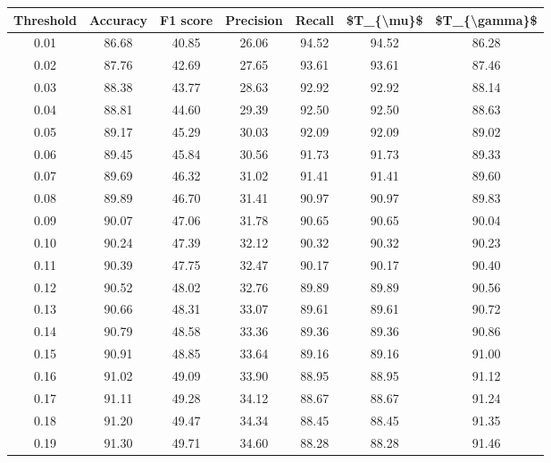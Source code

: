 \begin{tabular}{|c|c|c|c|c|c|c|}
\hline
 Threshold &  Accuracy &  F1 score &  Precision &  Recall &  \$T\_\{\textbackslash mu\}\$ &  \$T\_\{\textbackslash gamma\}\$ \\
\hline
      0.01 &     86.68 &     40.85 &      26.06 &   94.52 &      94.52 &         86.28 \\
      0.02 &     87.76 &     42.69 &      27.65 &   93.61 &      93.61 &         87.46 \\
      0.03 &     88.38 &     43.77 &      28.63 &   92.92 &      92.92 &         88.14 \\
      0.04 &     88.81 &     44.60 &      29.39 &   92.50 &      92.50 &         88.63 \\
      0.05 &     89.17 &     45.29 &      30.03 &   92.09 &      92.09 &         89.02 \\
      0.06 &     89.45 &     45.84 &      30.56 &   91.73 &      91.73 &         89.33 \\
      0.07 &     89.69 &     46.32 &      31.02 &   91.41 &      91.41 &         89.60 \\
      0.08 &     89.89 &     46.70 &      31.41 &   90.97 &      90.97 &         89.83 \\
      0.09 &     90.07 &     47.06 &      31.78 &   90.65 &      90.65 &         90.04 \\
      0.10 &     90.24 &     47.39 &      32.12 &   90.32 &      90.32 &         90.23 \\
      0.11 &     90.39 &     47.75 &      32.47 &   90.17 &      90.17 &         90.40 \\
      0.12 &     90.52 &     48.02 &      32.76 &   89.89 &      89.89 &         90.56 \\
      0.13 &     90.66 &     48.31 &      33.07 &   89.61 &      89.61 &         90.72 \\
      0.14 &     90.79 &     48.58 &      33.36 &   89.36 &      89.36 &         90.86 \\
      0.15 &     90.91 &     48.85 &      33.64 &   89.16 &      89.16 &         91.00 \\
      0.16 &     91.02 &     49.09 &      33.90 &   88.95 &      88.95 &         91.12 \\
      0.17 &     91.11 &     49.28 &      34.12 &   88.67 &      88.67 &         91.24 \\
      0.18 &     91.20 &     49.47 &      34.34 &   88.45 &      88.45 &         91.35 \\
      0.19 &     91.30 &     49.71 &      34.60 &   88.28 &      88.28 &         91.46 \\

\end{tabular}
